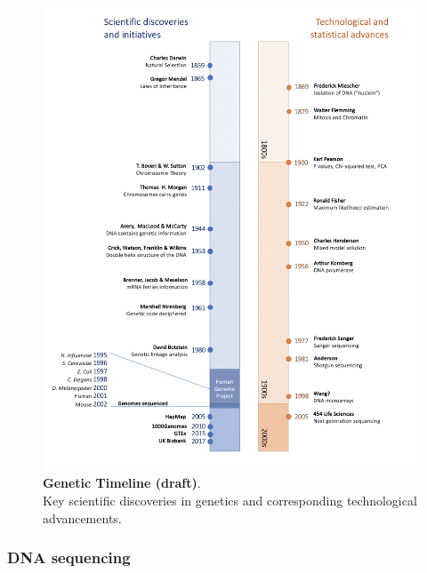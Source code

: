 \begin{figure}[htbp]
\centering
\includegraphics[width=13cm]{Chapter1/Fig/genetic_timeline_draft.png}
\caption[Genetic Timeline]{\textbf{Genetic Timeline (draft)}.\\
Key scientific discoveries in genetics and corresponding technological advancements.}
\label{fig:genetic_timeline}
\end{figure}

\subsubsection{DNA sequencing}


